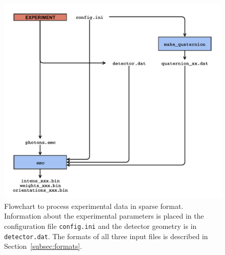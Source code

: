 \documentclass[]{iucr}              %
\begin{document}
\begin{figure}
\caption{Flowchart to process experimental data in sparse format. Information about the experimental parameters is placed in the configuration file \texttt{config.ini} and the detector geometry is in \texttt{detector.dat}. The formats of all three input files is described in Section~\ref{subsec:formats}.}\label{fig:expFlowchart}
\includegraphics[width=\textwidth]{figures/emc_exp.pdf}
\end{figure}
\end{document}
